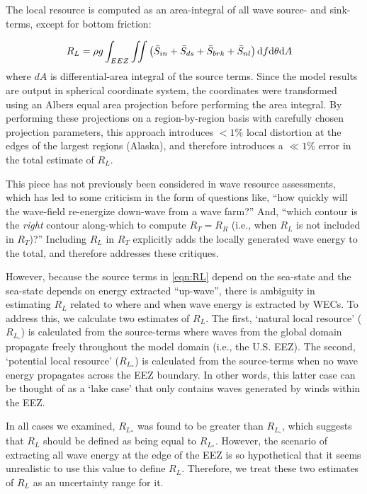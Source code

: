 The local resource is computed as an area-integral of all wave source- and sink-terms, except for bottom friction:

\begin{align}
  R_L &= \rho g \int_{EEZ}\iint \left ( \bar{S}_{in} + \bar{S}_{ds} + \bar{S}_{brk} + \bar{S}_{nl} \right ) \mathrm{d} f \mathrm{d} \theta \mathrm{d} A
\label{eqn:RL}
\end{align}
where $dA$ is differential-area integral of the source terms. Since the model results are output in spherical coordinate system, the coordinates were transformed using an Albers equal area projection before performing the area integral. By performing these projections on a region-by-region basis with carefully chosen projection parameters, this approach introduces $<1\% $ local distortion at the edges of the largest regions (Alaska), and therefore introduces a $\ll 1\%$ error in the total estimate of $R_L$.

This piece has not previously been considered in wave resource assessments, which has led to some criticism in the form of questions like, ``how quickly will the wave-field re-energize down-wave from a wave farm?''  And, ``which contour is the {\em right} contour along-which to compute $R_T = R_R$ (i.e., when $R_L$ is not included in $R_T$)?'' Including $R_L$ in $R_T$ explicitly adds the locally generated wave energy to the total, and therefore addresses these critiques. 

However, because the source terms in \eqref{eqn:RL} depend on the sea-state and the sea-state depends on energy extracted ``up-wave'', there is ambiguity in estimating $R_L$ related to where and when wave energy is extracted by WECs. To address this, we calculate two estimates of $R_L$. The first, `natural local resource' ($R_{L_\circ}$) is calculated from the source-terms where waves from the global domain propagate freely throughout the model domain (i.e., the U.S. EEZ). The second, `potential local resource' ($R_{L_*}$) is calculated from the source-terms when no wave energy propagates across the EEZ boundary. In other words, this latter case can be thought of as a `lake case' that only contains waves generated by winds within the EEZ. 

In all cases we examined, $R_{L_*}$ was found to be greater than $R_{L_\circ}$, which suggests that $R_L$ should be defined as being equal to $R_{L_*}$. However, the scenario of extracting all wave energy at the edge of the EEZ is so hypothetical that it seems unrealistic to use this value to define $R_L$. Therefore, we treat these two estimates of $R_L$ as an uncertainty range for it.

